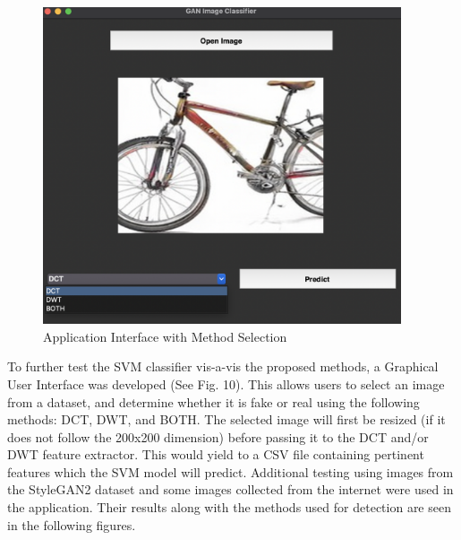 \documentclass{icsthesis}
\begin{document}
\begin{mainmatter}
\begin{figure}[ht]
    \centering
    \vspace{4ex}
	\includegraphics[width=400px]{imgs/app.png}
    \caption{Application Interface with Method Selection}
    \label{fig:enter-label}
\end{figure}

To further test the SVM classifier vis-a-vis the proposed methods, a Graphical User Interface was developed (See Fig. 10). This allows users to select an image from a dataset, and determine whether it is fake or real using the following methods: DCT, DWT, and BOTH. The selected image will first be resized (if it does not follow the 200x200 dimension) before passing it to the DCT and/or DWT feature extractor. This would yield to a CSV file containing pertinent features which the SVM model will predict. Additional testing using images from the StyleGAN2 dataset and some images collected from the internet were used in the application. Their results along with the methods used for detection are seen in the following figures. 


\end{mainmatter}
\end{document}

